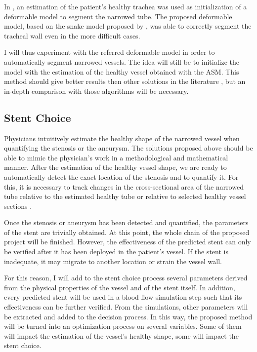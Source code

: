 \approach

In \citep{Pinho:Trachea4}, an estimation of the patient's healthy trachea was used as initialization of a deformable model to segment the narrowed tube. The proposed deformable model, based on the snake model proposed by \citep{Kass}, was able to correctly segment the tracheal wall even in the more difficult cases. 

I will thus experiment with the referred deformable model in order to automatically segment narrowed vessels. The idea will still be to initialize the model with the estimation of the healthy vessel obtained with the ASM. This method should give better results then other solutions in the literature \citep{CARR-07,Florez2,Antiga,Bemmel}, but an in-depth comparison with those algorithms will be necessary.

\subsection{Stent Choice}

Physicians intuitively estimate the healthy shape of the narrowed vessel when quantifying the stenosis or the aneurysm. The solutions proposed above should be able to mimic the physician's work in a methodological and mathematical manner. After the estimation of the healthy vessel shape, we are ready to automatically detect the exact location of the stenosis and to quantify it. For this, it is necessary to track changes in the cross-sectional area of the narrowed tube relative to the estimated healthy tube \citep{Pinho:Trachea4} or relative to selected healthy vessel sections \citep{Florez2,Bemmel}.

Once the stenosis or aneurysm has been detected and quantified, the parameters of the stent are trivially obtained. At this point, the whole chain of the proposed project will be finished. However, the effectiveness of the predicted stent can only be verified after it has been deployed in the patient's vessel. If the stent is inadequate, it may migrate to another location or strain the vessel wall. 

For this reason, I will add to the stent choice process several parameters derived from the physical properties of the vessel and of the stent itself. In addition, every predicted stent will be used in a blood flow simulation step such that its effectiveness can be further verified. From the simulations, other parameters will be extracted and added to the decision process. In this way, the proposed method will be turned into an optimization process on several variables. Some of them will impact the estimation of the vessel's healthy shape, some will impact the stent choice.

